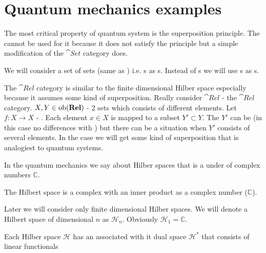 \section{Quantum mechanics examples}
\label{sec:qmcategory_example}
The most critical property of quantum system is the superposition
principle. The  cannot be used for it
because it does not satisfy the principle but a simple modification
of the $\cat{Set}$ category does. 
\begin{definition}
  \label{def:relcategory}
  We will consider a set of sets (same as )
  i.e. s as s. Instead of
  s we will use s as
  s. 

  The $\cat{Rel}$ category is similar to the finite dimensional
  Hilber space especially because it assumes some kind of superposition.
  Really consider $\cat{Rel}$ - the $\cat{Rel}$ category. $X, Y \in
  \mathrm{ob}(\mathbf{Rel})$ - 2 sets which consists of different elements. Let $f: X
  \to X$ - . Each element $x \in X$ is
  mapped to a subset $Y' \subset Y$. The $Y'$ can be
    (in this case no differences with
  ) but there can be a situation when $Y'$
  consists of several elements. In the case we will get some kind of
  superposition that is analogiest to quantum systems.
\end{definition}

In the quantum mechanics we say about Hilber spaces that is 
a  under  of complex
numbers $\mathbb{C}$. 



\begin{definition}
  \label{def:hilbert_space} The Hilbert space is a complex
   with an inner product as a complex
  number ($\mathbb{C}$). 

  Later we will consider only finite dimensional Hilber spaces.
  We will denote a Hilbert space of dimensional $n$ as
  $\mathcal{H}_n$. Obviously $\mathcal{H}_1 = \mathbb{C}$.
\end{definition}

\begin{definition}
\label{def:dual_space}
Each Hilber space $\mathcal{H}$ has an associated with it dual space
$\mathcal{H}^\ast$ that consists of linear functionals  
\end{definition}

